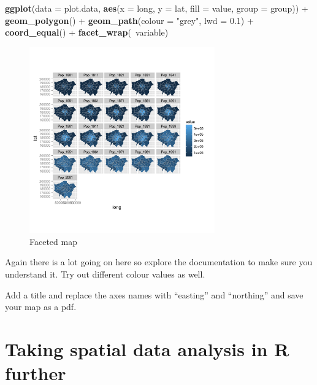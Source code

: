 \documentclass[]{article}
\newenvironment{Shaded}{}{}
\newcommand{\KeywordTok}[1]{\textcolor[rgb]{0.00,0.44,0.13}{\textbf{{#1}}}}
\newcommand{\DataTypeTok}[1]{\textcolor[rgb]{0.56,0.13,0.00}{{#1}}}
\newcommand{\FloatTok}[1]{\textcolor[rgb]{0.25,0.63,0.44}{{#1}}}
\newcommand{\StringTok}[1]{\textcolor[rgb]{0.25,0.44,0.63}{{#1}}}
\newcommand{\NormalTok}[1]{{#1}}
\let\Oldincludegraphics\includegraphics
\renewcommand{\includegraphics}[1]{\Oldincludegraphics[width=8cm]{#1}}
\begin{document}
\begin{Shaded}
\begin{Highlighting}[]
\KeywordTok{ggplot}\NormalTok{(}\DataTypeTok{data =} \NormalTok{plot.data, }\KeywordTok{aes}\NormalTok{(}\DataTypeTok{x =} \NormalTok{long, }\DataTypeTok{y =} \NormalTok{lat, }\DataTypeTok{fill =} \NormalTok{value, }\DataTypeTok{group =} \NormalTok{group)) + }
    \KeywordTok{geom_polygon}\NormalTok{() + }\KeywordTok{geom_path}\NormalTok{(}\DataTypeTok{colour =} \StringTok{"grey"}\NormalTok{, }\DataTypeTok{lwd =} \FloatTok{0.1}\NormalTok{) + }\KeywordTok{coord_equal}\NormalTok{() + }
    \KeywordTok{facet_wrap}\NormalTok{(~variable)}
\end{Highlighting}
\end{Shaded}
\begin{figure}[htbp]
\centering
\includegraphics{figure/Faceted_map.png}
\caption{Faceted map}
\end{figure}

Again there is a lot going on here so explore the documentation to make
sure you understand it. Try out different colour values as well.

Add a title and replace the axes names with ``easting'' and ``northing''
and save your map as a pdf.

\section{Taking spatial data analysis in R further}
\end{document}
